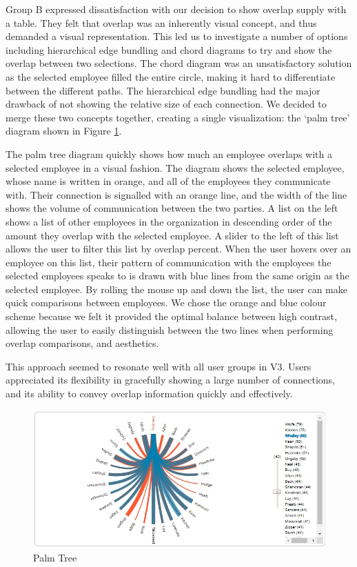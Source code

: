 \documentclass[journal]{vgtc}                %
\begin{document}
Group B expressed dissatisfaction with our decision to show overlap supply with a table. They felt that overlap was an inherently visual concept, and thus demanded a visual representation. This led us to investigate a number of options including hierarchical edge bundling and chord diagrams to try and show the overlap between two selections.  The chord diagram was an unsatisfactory solution as the selected employee filled the entire circle, making it hard to differentiate between the different paths.  The hierarchical edge bundling had the major drawback of not showing the relative size of each connection.  We decided to merge these two concepts together, creating a single visualization: the \lq palm tree\rq{} diagram shown in Figure \ref{fig:palm}.

The palm tree diagram quickly shows how much an employee overlaps with a selected employee in a visual fashion. The diagram shows the selected employee, whose name is written in orange, and all of the employees they communicate with. Their connection is signalled with an orange line, and the width of the line shows the volume of communication between the two parties. A list on the left shows a list of other employees in the organization in descending order of the amount they overlap with the selected employee. A slider to the left of this list allows the user to filter this list by overlap percent. When the user hovers over an employee on this list, their pattern of communication with the employees the selected employees speaks to is drawn with blue lines from the same origin as the selected employee. By rolling the mouse up and down the list, the user can make quick comparisons between employees. We chose the orange and blue colour scheme because we felt it provided the optimal balance between high contrast, allowing the user to easily distinguish between the two lines when performing overlap comparisons, and aesthetics. 

This approach seemed to resonate well with all user groups in V3.  Users appreciated its flexibility in gracefully showing a large number of connections, and its ability to convey overlap information quickly and effectively. 

\begin{figure}
	\centering
	\includegraphics[width=\columnwidth]{pictures/palmtree.jpg}
	\caption{Palm Tree}
	\label{fig:palm}
\end{figure}
\end{document}
